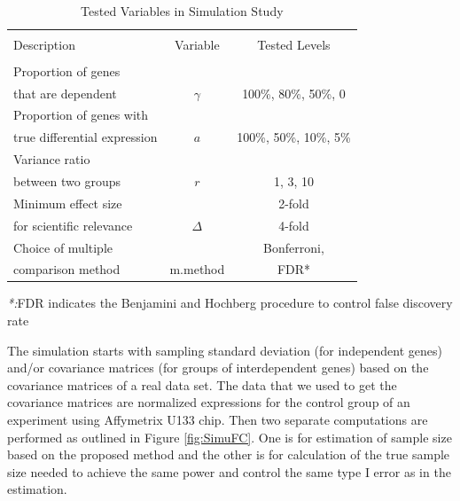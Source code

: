 \documentclass{bioinfo}
\begin{document}
\begin{table}[h]\centering
  \caption{Tested Variables in Simulation Study}\ \\
  \begin{tabular}{lcc}
    \hline\hline
    \\
    Description & Variable & Tested Levels \\
    \\
    \hline\hline
    Proportion of genes & & \\
    that are dependent & $\gamma$ & 100\%, 80\%, 50\%, 0\\
    \hline
    Proportion of genes with & & \\
    true differential expression & $a$ & 100\%, 50\%,
    10\%, 5\% \\
    \hline
    Variance ratio &  &\\
    between two groups & $r$ & 1, 3, 10  \\
    \hline
    Minimum effect size  & &2-fold \\
    for scientific relevance & $\Delta$ & 4-fold \\
    \hline
    Choice of multiple  & & Bonferroni,  \\
    comparison method & m.method & FDR* \\
    \hline\hline
  \end{tabular}
  \emph{*:}FDR indicates the Benjamini and Hochberg procedure to control false discovery rate \label{tb:SimuVariables}
\end{table}

The simulation starts with sampling standard deviation (for
independent genes) and/or covariance matrices (for groups of
interdependent genes) based on the covariance matrices of a real
data set. The data that we used to get the covariance matrices are
normalized expressions for the control group of an experiment
using Affymetrix U133 chip. Then two separate computations are
performed as outlined in Figure \ref{fig:SimuFC}. One is for
estimation of sample size based on the proposed method and the
other is for calculation of the true sample size needed to achieve
the same power and control the same type I error as in the
estimation.
\end{document}

